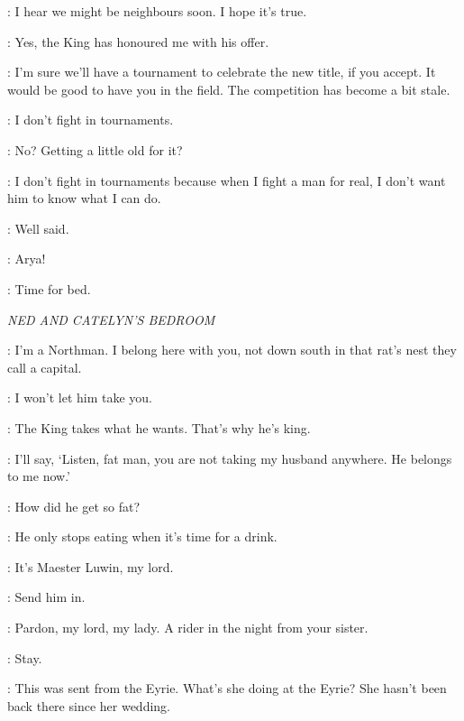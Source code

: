 \JAIME: I hear we might be neighbours soon. I hope it's true. 

\NED: Yes, the King has honoured me with his offer. 

\JAIME: I'm sure we'll have a tournament to celebrate the new title, if you accept. It would be good to have you in the field. The competition has become a bit stale. 

\NED: I don't fight in tournaments. 

\JAIME: No? Getting a little old for it? 

\NED: I don't fight in tournaments because when I fight a man for real, I don't want him to know what I can do. 

\JAIME: Well said. 


\SANSA: Arya! 


\ROBB: Time for bed. 


\scene

\textit{NED AND CATELYN'S BEDROOM} 


\NED: I'm a Northman. I belong here with you, not down south in that rat's nest they call a capital. 

\CATELYN: I won't let him take you. 

\NED: The King takes what he wants. That's why he's king. 

\CATELYN: I'll say, `Listen, fat man, you are not taking my husband anywhere. He belongs to me now.' 

\NED: How did he get so fat? 

\CATELYN: He only stops eating when it's time for a drink. 


\SERVANT: It's Maester Luwin, my lord. 

\NED: Send him in. 

\LUWIN: Pardon, my lord, my lady. A rider in the night from your sister. 


\NED: Stay. 

\CATELYN: This was sent from the Eyrie. What's she doing at the Eyrie? She hasn't been back there since her wedding. 


